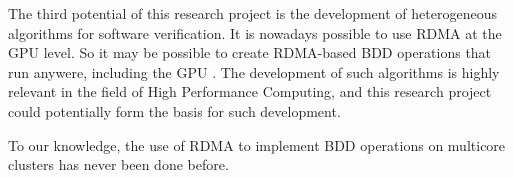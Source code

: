 The third potential of this research project is the development of heterogeneous algorithms for software verification. It is nowadays possible to use RDMA at the GPU level. So it may be possible to create RDMA-based BDD operations that run anywere, including the GPU \cite{gpudirect}. The development of such algorithms is highly relevant in the field of High Performance Computing, and this research project could potentially form the basis for such development.

To our knowledge, the use of RDMA to implement BDD operations on multicore clusters has never been done before.